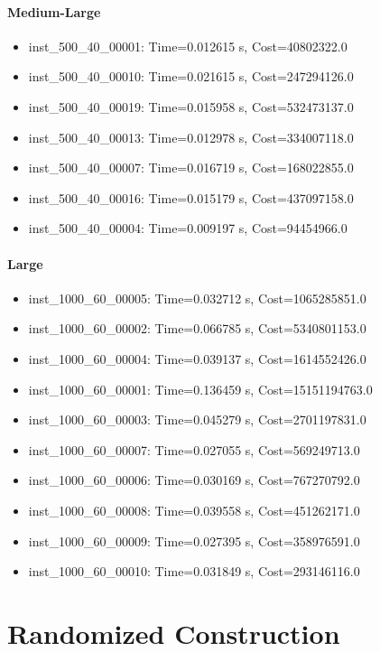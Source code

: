 \documentclass{article}
\begin{document}
\paragraph{Medium-Large}
\begin{itemize}
\item inst\_500\_40\_00001: Time=0.012615 s,  Cost=40802322.0
\item inst\_500\_40\_00010: Time=0.021615 s,  Cost=247294126.0
\item inst\_500\_40\_00019: Time=0.015958 s,  Cost=532473137.0
\item inst\_500\_40\_00013: Time=0.012978 s,  Cost=334007118.0
\item inst\_500\_40\_00007: Time=0.016719 s,  Cost=168022855.0
\item inst\_500\_40\_00016: Time=0.015179 s,  Cost=437097158.0
\item inst\_500\_40\_00004: Time=0.009197 s,  Cost=94454966.0
\end{itemize}


\paragraph{Large}
\begin{itemize}
\item inst\_1000\_60\_00005: Time=0.032712 s,  Cost=1065285851.0
\item inst\_1000\_60\_00002: Time=0.066785 s,  Cost=5340801153.0
\item inst\_1000\_60\_00004: Time=0.039137 s,  Cost=1614552426.0
\item inst\_1000\_60\_00001: Time=0.136459 s,  Cost=15151194763.0
\item inst\_1000\_60\_00003: Time=0.045279 s,  Cost=2701197831.0
\item inst\_1000\_60\_00007: Time=0.027055 s,  Cost=569249713.0
\item inst\_1000\_60\_00006: Time=0.030169 s,  Cost=767270792.0
\item inst\_1000\_60\_00008: Time=0.039558 s,  Cost=451262171.0
\item inst\_1000\_60\_00009: Time=0.027395 s,  Cost=358976591.0
\item inst\_1000\_60\_00010: Time=0.031849 s,  Cost=293146116.0
\end{itemize}


\section*{Randomized Construction}
\end{document}
